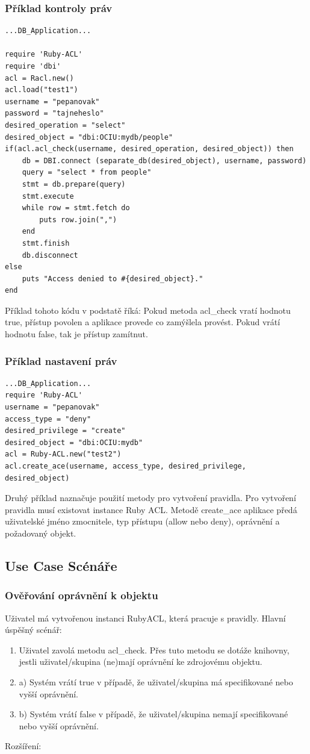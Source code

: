 \documentclass[11pt,twoside,a4paper]{book}
\begin{document}
\subsubsection{Příklad kontroly práv}
\begin{verbatim}
...DB_Application...

require 'Ruby-ACL'
require 'dbi'
acl = Racl.new()
acl.load("test1")
username = "pepanovak"
password = "tajneheslo"
desired_operation = "select"
desired_object = "dbi:OCIU:mydb/people"
if(acl.acl_check(username, desired_operation, desired_object)) then
	db = DBI.connect (separate_db(desired_object), username, password)
	query = "select * from people"
	stmt = db.prepare(query)
	stmt.execute
	while row = stmt.fetch do
		puts row.join(",")
	end
	stmt.finish
	db.disconnect
else
	puts "Access denied to #{desired_object}."
end
\end{verbatim}

Příklad tohoto kódu v podstatě říká: Pokud metoda acl\_check vratí hodnotu true, přístup povolen a aplikace provede co zamýšlela provést. Pokud vrátí hodnotu false, tak je přístup zamítnut.

\subsubsection{Příklad nastavení práv}

\begin{verbatim}
...DB_Application...
require 'Ruby-ACL'
username = "pepanovak"
access_type = "deny"
desired_privilege = "create"
desired_object = "dbi:OCIU:mydb"
acl = Ruby-ACL.new("test2")
acl.create_ace(username, access_type, desired_privilege, desired_object)
\end{verbatim}

Druhý příklad naznačuje použití metody pro vytvoření pravidla. Pro vytvoření pravidla musí existovat instance Ruby ACL. Metodě create\_ace aplikace předá uživatelské jméno zmocnitele, typ přístupu (allow nebo deny), oprávnění a požadovaný objekt.

\subsection{Use Case Scénáře}
\subsubsection{Ověřování oprávnění k objektu}
Uživatel má vytvořenou instanci RubyACL, která pracuje s pravidly.
Hlavní úspěšný scénář:
\begin{enumerate}
\item Uživatel zavolá metodu acl\_check. Přes tuto metodu se dotáže knihovny, jestli uživatel/skupina (ne)mají oprávnění ke zdrojovému objektu.
\item a) Systém vrátí true v případě, že uživatel/skupina má specifikované nebo vyšší oprávnění.
\item b) Systém vrátí false v případě, že uživatel/skupina nemají specifikované nebo vyšší oprávnění.
\end{enumerate}
Rozšíření:
\end{document}
